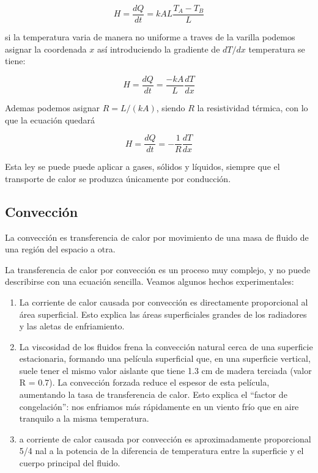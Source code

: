 \begin{equation*}
    \label{eq:conduccion}
    H = \frac{dQ}{dt} = kAL\frac{T_A - T_B}{L}
\end{equation*}

si la temperatura varia
de manera no uniforme a traves 
de la varilla podemos
asignar la coordenada $x$ así introduciendo
la gradiente de $dT/dx$ temperatura se tiene:

\begin{equation*}
    \label{eq:conduccion-x}
    H = \frac{dQ}{dt} = \frac{-kA}{L}\frac{dT}{dx}
\end{equation*}

Ademas podemos asignar $R = L/(kA)$, siendo $R$ la resistividad
térmica, con lo que la ecuación quedará

\begin{equation}
    \label{eq:conduccion-r}
    H = \frac{dQ}{dt} = -\frac{1}{R}\frac{dT}{dx}
\end{equation}

Esta ley se puede puede aplicar a gases, sólidos y líquidos,
siempre que el transporte de calor se produzca únicamente
por conducción.

\subsection{Convección}
La convección es transferencia de calor por movimiento de una masa de fluido de una
región del espacio a otra.

La transferencia de calor por convección es un proceso muy complejo, y no puede
describirse con una ecuación sencilla. Veamos algunos hechos experimentales:

\begin{enumerate}
    \item  La corriente de calor causada por convección es directamente proporcional al
    área superficial. Esto explica las áreas superficiales grandes de los radiadores y
    las aletas de enfriamiento.

    \item La viscosidad de los fluidos frena la convección natural cerca de una superficie
    estacionaria, formando una película superficial que, en una superficie vertical,
    suele tener el mismo valor aislante que tiene 1.3 cm de madera terciada (valor
    R = 0.7). La convección forzada reduce el espesor de esta película, aumentando
    la tasa de transferencia de calor. Esto explica el “factor de congelación”: nos
    enfriamos más rápidamente en un viento frío que en aire tranquilo a la misma
    temperatura.

    \item a corriente de calor causada por convección es aproximadamente proporcional 5/4 
    nal a la potencia de la diferencia de temperatura entre la superficie y el cuerpo
    principal del fluido.

\end{enumerate}

